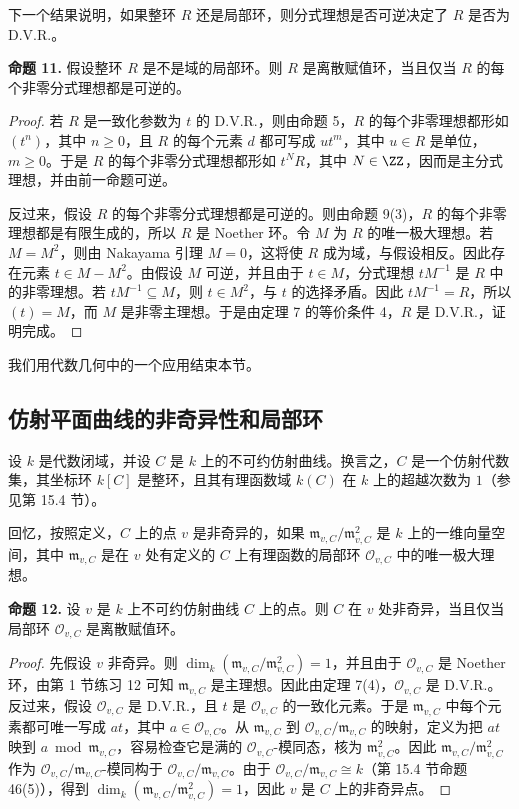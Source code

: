 下一个结果说明，如果整环 $R$ 还是局部环，则分式理想是否可逆决定了 $R$ 是否为 D.V.R.。

\medskip
\noindent\textbf{命题 11.} 假设整环 $R$ 是不是域的局部环。则 $R$ 是离散赋值环，当且仅当 $R$ 的每个非零分式理想都是可逆的。

\begin{proof}
若 $R$ 是一致化参数为 $t$ 的 D.V.R.，则由命题 5，$R$ 的每个非零理想都形如 $(t^n)$，其中 $n\geq0$，且 $R$ 的每个元素 $d$ 都可写成 $ut^m$，其中 $u\in R$ 是单位，$m\geq0$。于是 $R$ 的每个非零分式理想都形如 $t^N R$，其中 $N\in\ZZ$，因而是主分式理想，并由前一命题可逆。

反过来，假设 $R$ 的每个非零分式理想都是可逆的。则由命题 9(3)，$R$ 的每个非零理想都是有限生成的，所以 $R$ 是 Noether 环。令 $M$ 为 $R$ 的唯一极大理想。若 $M=M^2$，则由 Nakayama 引理 $M=0$，这将使 $R$ 成为域，与假设相反。因此存在元素 $t\in M-M^2$。由假设 $M$ 可逆，并且由于 $t\in M$，分式理想 $tM^{-1}$ 是 $R$ 中的非零理想。若 $tM^{-1}\subseteq M$，则 $t\in M^2$，与 $t$ 的选择矛盾。因此 $tM^{-1}=R$，所以 $(t)=M$，而 $M$ 是非零主理想。于是由定理 7 的等价条件 4，$R$ 是 D.V.R.，证明完成。
\end{proof}

我们用代数几何中的一个应用结束本节。

\subsection*{仿射平面曲线的非奇异性和局部环}

设 $k$ 是代数闭域，并设 $C$ 是 $k$ 上的不可约仿射曲线。换言之，$C$ 是一个仿射代数集，其坐标环 $k[C]$ 是整环，且其有理函数域 $k(C)$ 在 $k$ 上的超越次数为 $1$（参见第 15.4 节）。

回忆，按照定义，$C$ 上的点 $v$ 是非奇异的，如果 $\mathfrak m_{v,C}/\mathfrak m_{v,C}^2$ 是 $k$ 上的一维向量空间，其中 $\mathfrak m_{v,C}$ 是在 $v$ 处有定义的 $C$ 上有理函数的局部环 $\mathcal O_{v,C}$ 中的唯一极大理想。

\medskip
\noindent\textbf{命题 12.} 设 $v$ 是 $k$ 上不可约仿射曲线 $C$ 上的点。则 $C$ 在 $v$ 处非奇异，当且仅当局部环 $\mathcal O_{v,C}$ 是离散赋值环。

\begin{proof}
先假设 $v$ 非奇异。则 $\dim_k(\mathfrak m_{v,C}/\mathfrak m_{v,C}^2)=1$，并且由于 $\mathcal O_{v,C}$ 是 Noether 环，由第 1 节练习 12 可知 $\mathfrak m_{v,C}$ 是主理想。因此由定理 7(4)，$\mathcal O_{v,C}$ 是 D.V.R.。反过来，假设 $\mathcal O_{v,C}$ 是 D.V.R.，且 $t$ 是 $\mathcal O_{v,C}$ 的一致化元素。于是 $\mathfrak m_{v,C}$ 中每个元素都可唯一写成 $at$，其中 $a\in\mathcal O_{v,C}$。从 $\mathfrak m_{v,C}$ 到 $\mathcal O_{v,C}/\mathfrak m_{v,C}$ 的映射，定义为把 $at$ 映到 $a\bmod\mathfrak m_{v,C}$，容易检查它是满的 $\mathcal O_{v,C}$-模同态，核为 $\mathfrak m_{v,C}^2$。因此 $\mathfrak m_{v,C}/\mathfrak m_{v,C}^2$ 作为 $\mathcal O_{v,C}/\mathfrak m_{v,C}$-模同构于 $\mathcal O_{v,C}/\mathfrak m_{v,C}$。由于 $\mathcal O_{v,C}/\mathfrak m_{v,C}\cong k$（第 15.4 节命题 46(5)），得到 $\dim_k(\mathfrak m_{v,C}/\mathfrak m_{v,C}^2)=1$，因此 $v$ 是 $C$ 上的非奇异点。
\end{proof}

